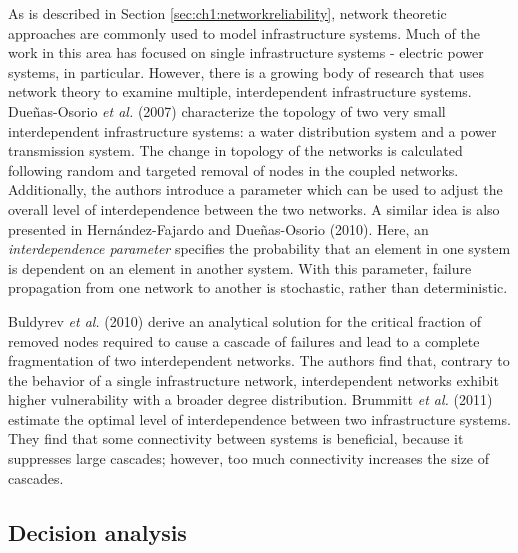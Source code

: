 As is described in Section \ref{sec:ch1:networkreliability}, network theoretic approaches are commonly used to model infrastructure systems.  Much of the work in this area has focused on single infrastructure systems - electric power systems, in particular.  However, there is a growing body of research that uses network theory to examine multiple, interdependent infrastructure systems.  Due\~{n}as-Osorio \emph{et al.} (2007) \cite{Duenas-Osorio2007} characterize the topology of two very small interdependent infrastructure systems: a water distribution system and a power transmission system.  The change in topology of the networks is calculated following random and targeted removal of nodes in the coupled networks.  Additionally, the authors introduce a parameter which can be used to adjust the overall level of interdependence between the two networks.  A similar idea is also presented in Hern\'{a}ndez-Fajardo and Due\~{n}as-Osorio (2010)\cite{Hernandez-Fajardo2010}.  Here, an \emph{interdependence parameter} specifies the probability that an element in one system is dependent on an element in another system.  With this parameter, failure propagation from one network to another is stochastic, rather than deterministic.

Buldyrev \emph{et al.} (2010)\cite{Buldyrev2010} derive an analytical solution for the critical fraction of removed nodes required to cause a cascade of failures and lead to a complete fragmentation of two interdependent networks.  The authors find that, contrary to the behavior of a single infrastructure network, interdependent networks exhibit higher vulnerability with a broader degree distribution.  Brummitt \emph{et al.} (2011)\cite{Brummitt2011} estimate the optimal level of interdependence between two infrastructure systems.  They find that some connectivity between systems is beneficial, because it suppresses large cascades; however, too much connectivity increases the size of cascades.


\subsection{Decision analysis}
\label{sec:ch1:interdependentreliability:da}

